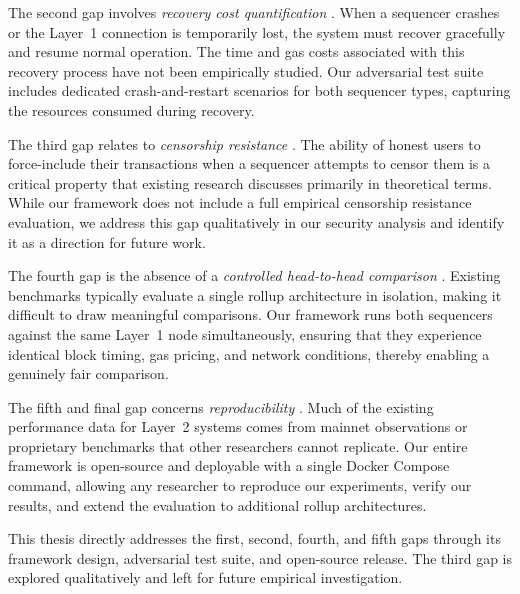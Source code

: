 The second gap involves \textit{recovery cost quantification} \label{gap:recovery}. When a sequencer crashes or the Layer~1 connection is temporarily lost, the system must recover gracefully and resume normal operation. The time and gas costs associated with this recovery process have not been empirically studied. Our adversarial test suite includes dedicated crash-and-restart scenarios for both sequencer types, capturing the resources consumed during recovery.

The third gap relates to \textit{censorship resistance} \label{gap:censorship}. The ability of honest users to force-include their transactions when a sequencer attempts to censor them is a critical property that existing research discusses primarily in theoretical terms. While our framework does not include a full empirical censorship resistance evaluation, we address this gap qualitatively in our security analysis and identify it as a direction for future work.

The fourth gap is the absence of a \textit{controlled head-to-head comparison} \label{gap:comparison}. Existing benchmarks typically evaluate a single rollup architecture in isolation, making it difficult to draw meaningful comparisons. Our framework runs both sequencers against the same Layer~1 node simultaneously, ensuring that they experience identical block timing, gas pricing, and network conditions, thereby enabling a genuinely fair comparison.

The fifth and final gap concerns \textit{reproducibility} \label{gap:reproducibility}. Much of the existing performance data for Layer~2 systems comes from mainnet observations or proprietary benchmarks that other researchers cannot replicate. Our entire framework is open-source and deployable with a single Docker Compose command, allowing any researcher to reproduce our experiments, verify our results, and extend the evaluation to additional rollup architectures.

This thesis directly addresses the first, second, fourth, and fifth gaps through its framework design, adversarial test suite, and open-source release. The third gap is explored qualitatively and left for future empirical investigation.
